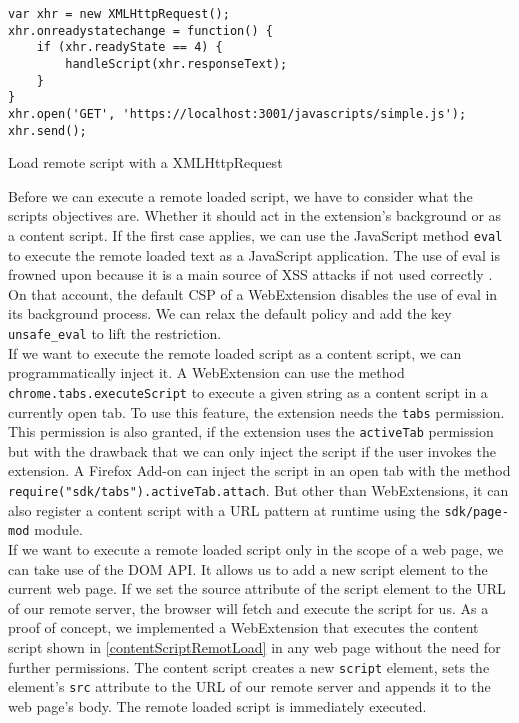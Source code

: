 	\begin{code}
		\begin{lstlisting}
var xhr = new XMLHttpRequest();
xhr.onreadystatechange = function() {
	if (xhr.readyState == 4) {
		handleScript(xhr.responseText);
	}
}
xhr.open('GET', 'https://localhost:3001/javascripts/simple.js');
xhr.send();
\end{lstlisting}
		\caption{Load remote script with a XMLHttpRequest}
		\label{xhrLoadScript}
	\end{code}

	Before we can execute a remote loaded script, we have to consider what the scripts objectives are. Whether it should act in the extension's background or as a content script. If the first case applies, we can use the JavaScript method \texttt{eval} to execute the remote loaded text as a JavaScript application. The use of eval is frowned upon because it is a main source of XSS attacks if not used correctly \cite{mozillaDangerousEval}. On that account, the default CSP of a WebExtension disables the use of eval in its background process. We can relax the default policy and add the key \texttt{unsafe\_eval} to lift the restriction. \\
	
	If we want to execute the remote loaded script as a content script, we can programmatically inject it. A WebExtension can use the method \texttt{chrome.tabs.executeScript} to execute a given string as a content script in a currently open tab. To use this feature, the extension needs the \texttt{tabs} permission. This permission is also granted, if the extension uses the \texttt{activeTab} permission but with the drawback that we can only inject the script if the user invokes the extension. A Firefox Add-on can inject the script in an open tab with the method \texttt{require("sdk/tabs").activeTab.attach}. But other than WebExtensions, it can also register a content script with a URL pattern at runtime using the \texttt{sdk/page-mod} module. \\
	
	If we want to execute a remote loaded script only in the scope of a web page, we can take use of the DOM API. It allows us to add a new script element to the current web page. If we set the source attribute of the script element to the URL of our remote server, the browser will fetch and execute the script for us. As a proof of concept, we  implemented a WebExtension that executes the content script shown in \autoref{contentScriptRemotLoad} in any web page without the need for further permissions. The content script creates a new \texttt{script} element, sets the element's \texttt{src} attribute to the URL of our remote server and appends it to the web page's body. The remote loaded script is immediately executed.
	
